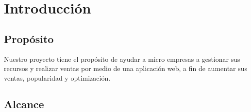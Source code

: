 \chapter{Introducción}

\section{Propósito}

Nuestro proyecto tiene el propósito de ayudar a micro empresas a gestionar sus recursos y realizar ventas por medio de una aplicación web, a fin de aumentar sus ventas, popularidad y optimización.

\section{Alcance}

